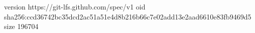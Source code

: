 version https://git-lfs.github.com/spec/v1
oid sha256:ccd36742bc35dcd2ac51a51e4d8b216b66c7e02add13e2aad6610e83fb9469d5
size 196704
